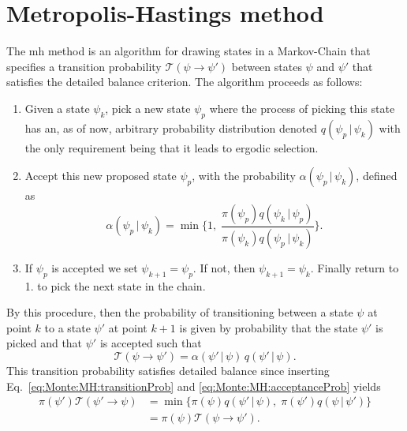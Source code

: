 \section{Metropolis-Hastings method}

The \ac{mh} method is an algorithm for drawing states in a Markov-Chain that specifies a transition probability
$\mathcal{T}(\psi\to\psi')$ between states $\psi$ and $\psi'$ that satisfies the detailed balance criterion. The algorithm proceeds
as follows:
\begin{enumerate}
    \item Given a state $\psi_k$, pick a new state $\psi_p$ where the process of picking this state has an, as of now, arbitrary
        probability distribution denoted $q(\psi_p\,|\,\psi_k)$ with the only requirement being that it leads to ergodic selection.
    \item Accept this new proposed state $\psi_p$, with the probability $\alpha(\psi_p\,|\,\psi_k)$,
        defined as
        \begin{equation}
            \label{eq:Monte:MH:acceptanceProb}
            \alpha(\psi_p\,|\,\psi_k) = \min\bigg\{1,\;\frac{\pi(\psi_p)q(\psi_k\,|\,\psi_p)}{\pi(\psi_k)q(\psi_p\,|\,\psi_k)}\bigg\}.
        \end{equation}
    \item If $\psi_p$ is accepted we set $\psi_{k+1}=\psi_p$. If not, then $\psi_{k+1}=\psi_k$. Finally return to 1. to pick the next
        state in the chain.
\end{enumerate}
By this procedure, then the probability of transitioning between a state $\psi$ at point $k$ to a state $\psi'$ at point $k+1$ is
given by probability that the state $\psi'$ is picked and that $\psi'$ is accepted such that
\begin{equation}
    \label{eq:Monte:MH:transitionProb}
    \mathcal{T}(\psi\to\psi') = \alpha(\psi'\,|\,\psi)\,q(\psi'\,|\,\psi).
\end{equation}
This transition probability satisfies detailed balance since inserting Eq.~\eqref{eq:Monte:MH:transitionProb} and
\eqref{eq:Monte:MH:acceptanceProb} yields
\begin{equation}
    \label{eq:Monte:MH:detailedBalance}
    \begin{split}
        \pi(\psi')\mathcal{T}(\psi'\to\psi) &= \min\{\pi(\psi)q(\psi'\,|\,\psi),\;\pi(\psi')q(\psi\,|\,\psi')\}\\
        &= \pi(\psi)\mathcal{T}(\psi\to\psi').
    \end{split}
\end{equation}

